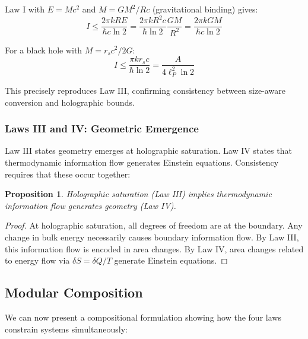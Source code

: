 \documentclass[11pt,a4paper]{article}
\theoremstyle{plain}
\newtheorem{proposition}[theorem]{Proposition}
\theoremstyle{definition}
\theoremstyle{remark}
\begin{document}
Law I with $E=Mc^2$ and $M = GM^2/Rc$ (gravitational binding) gives:
\begin{equation}
I \leq \frac{2\pi kRE}{\hbar c\ln 2} = \frac{2\pi kR^2c}{\hbar\ln 2}\frac{GM}{R^2} = \frac{2\pi kGM}{\hbar c\ln 2}
\end{equation}

For a black hole with $M = r_s c^2/2G$:
\begin{equation}
I \leq \frac{\pi kr_s c}{\hbar\ln 2} = \frac{A}{4\ell_P^2\ln 2}
\end{equation}

This precisely reproduces Law III, confirming consistency between size-aware conversion and holographic bounds.

\subsubsection{Laws III and IV: Geometric Emergence}

Law III states geometry emerges at holographic saturation. Law IV states that thermodynamic information flow generates Einstein equations. Consistency requires that these occur together:

\begin{proposition}
Holographic saturation (Law III) implies thermodynamic information flow generates geometry (Law IV).
\end{proposition}

\begin{proof}
At holographic saturation, all degrees of freedom are at the boundary. Any change in bulk energy necessarily causes boundary information flow. By Law III, this information flow is encoded in area changes. By Law IV, area changes related to energy flow via $\delta S = \delta Q/T$ generate Einstein equations.
\end{proof}

\subsection{Modular Composition}

We can now present a compositional formulation showing how the four laws constrain systems simultaneously:
\end{document}
